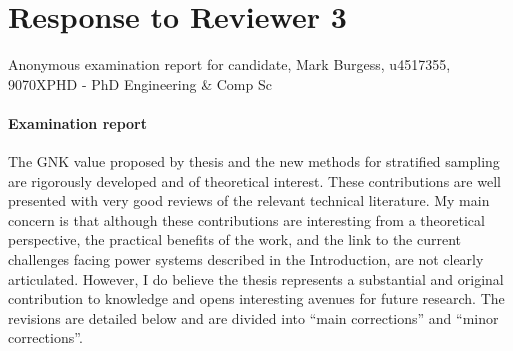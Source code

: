 \documentclass{article}
\begin{document}
\section{Response to Reviewer 3}

Anonymous examination report for candidate, Mark Burgess, u4517355, 9070XPHD - PhD Engineering \& Comp Sc

\paragraph{Examination report}
The GNK value proposed by thesis and the new methods for stratified sampling are
rigorously developed and of theoretical interest. These contributions are well
presented with very good reviews of the relevant technical literature. My main
concern is that although these contributions are interesting from a theoretical
perspective, the practical benefits of the work, and the link to the current challenges
facing power systems described in the Introduction, are not clearly articulated.
However, I do believe the thesis represents a substantial and original contribution to
knowledge and opens interesting avenues for future research.
The revisions are detailed below and are divided into “main corrections” and “minor
corrections”.
\end{document}
